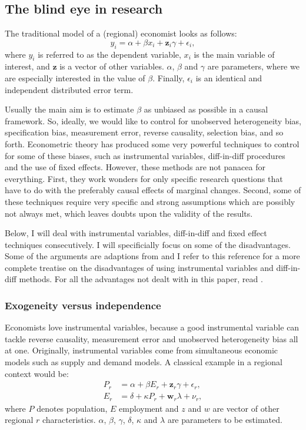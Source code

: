 \documentclass[fleqn,10pt]{SelfArx} %
\begin{document}
\subsection{The blind eye in research}

The traditional model of a (regional) economist looks as follows:
\begin{equation}
  \label{model_economist}
  y_i = \alpha + \beta x_i + \mathbf{z}_i\gamma + \epsilon_i,
\end{equation}
where $y_i$ is referred to as the dependent variable, $x_i$ is the main variable of
interest, and $\mathbf{z}$ is a vector of other variables. $\alpha$, $\beta$ and
$\gamma$ are parameters, where we are especially interested in the value of
$\beta$. Finally, $\epsilon_i$ is an identical and independent distributed error
term.

Usually the main aim is to estimate $\beta$ as unbiased as possible in a causal framework. So, ideally, we
would like to control for unobserved heterogeneity bias, specification bias,
measurement error, reverse causality, selection bias, and so forth. Econometric
theory has produced some very powerful techniques to control for some of these
biases, such as instrumental variables, diff-in-diff procedures and the use of
fixed effects. However, these methods are not panacea for everything. First, they work
wonders for only specific research questions that have to do with the preferably
causal effects of marginal changes. Second, some of these techniques require very specific and
strong assumptions which are possibly not always met, which leaves doubts upon
the validity of the results. 

Below, I will deal with instrumental variables, diff-in-diff and fixed effect
techniques consecutively. I will specificially focus on some of the disadvantages. Some of the
arguments are adaptions from \citet{deaton2010instruments} and I refer to this
reference for a more complete treatise on the disadvantages of using
instrumental variables and diff-in-diff methods. For all the advantages not
dealt with in this paper, read \citet{angrist2008mostly}. 

\subsubsection{Exogeneity versus independence}

Economists love instrumental variables, because a good instrumental variable can
tackle reverse causality, measurement error and unobserved heterogeneity bias
all at one. Originally, instrumental variables come from simultaneous economic
models such as supply and demand models. A classical example in a regional
context would be:
\begin{align}
  P_r &=  \alpha + \beta E_r + \mathbf{z}_r\gamma + \epsilon_r, \label{P}\\
  E_r &=  \delta + \kappa P_r+ \mathbf{w}_r\lambda + \nu_r,\label{E}
\end{align}
where $P$ denotes population, $E$ employment and $z$ and $w$ are vector of other
regional $r$ characteristics. $\alpha$, $\beta$, $\gamma$, $\delta$, $\kappa$
and $\lambda$ are parameters to be estimated.
\end{document}
